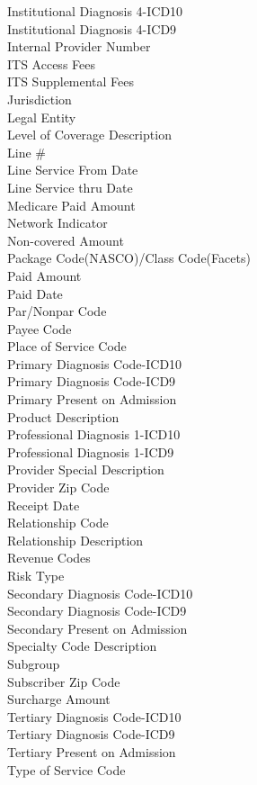 \documentclass[twoside,11pt]{article}
\begin{document}
{\begin{multicols}{2}
Institutional Diagnosis 4-ICD10 \\
Institutional Diagnosis 4-ICD9 \\
Internal Provider Number \\
ITS Access Fees \\
ITS Supplemental Fees \\
Jurisdiction \\
Legal Entity \\
Level of Coverage Description \\
Line \# \\
Line Service From Date \\
Line Service thru Date \\
Medicare Paid Amount \\
Network Indicator \\
Non-covered Amount \\
Package Code(NASCO)/Class Code(Facets)  \\
Paid Amount \\
Paid Date \\
Par/Nonpar Code  \\
Payee Code \\
Place of Service Code \\
Primary Diagnosis Code-ICD10 \\
Primary Diagnosis Code-ICD9 \\
Primary Present on Admission \\
Product Description \\
Professional Diagnosis 1-ICD10 \\
Professional Diagnosis 1-ICD9 \\
Provider Special Description \\
Provider Zip Code \\
Receipt Date \\
Relationship Code \\
Relationship Description \\
Revenue Codes \\
Risk Type \\
Secondary Diagnosis Code-ICD10 \\
Secondary Diagnosis Code-ICD9 \\
Secondary Present on Admission \\
Specialty Code Description \\
Subgroup \\
Subscriber Zip Code \\
Surcharge Amount \\
Tertiary Diagnosis Code-ICD10 \\
Tertiary Diagnosis Code-ICD9 \\
Tertiary Present on Admission \\
Type of Service Code \\
\end{multicols}

}
\end{document}
